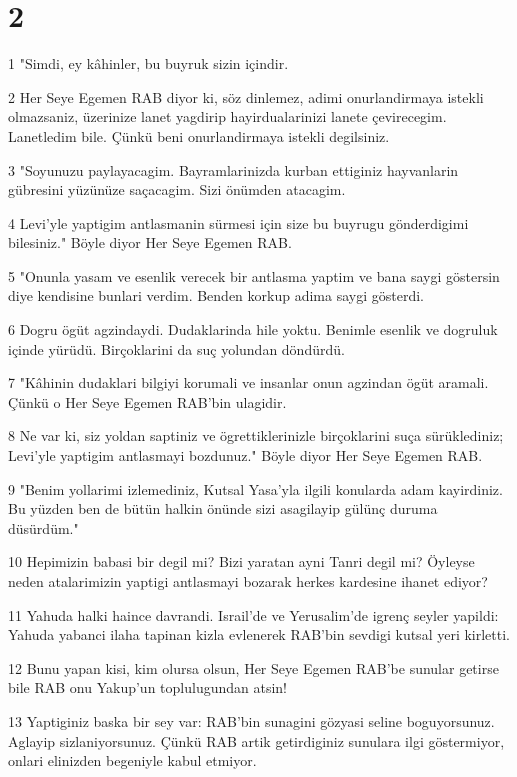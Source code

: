\chapter{2}

\par 1 "Simdi, ey kâhinler, bu buyruk sizin içindir.
\par 2 Her Seye Egemen RAB diyor ki, söz dinlemez, adimi onurlandirmaya istekli olmazsaniz, üzerinize lanet yagdirip hayirdualarinizi lanete çevirecegim. Lanetledim bile. Çünkü beni onurlandirmaya istekli degilsiniz.
\par 3 "Soyunuzu paylayacagim. Bayramlarinizda kurban ettiginiz hayvanlarin gübresini yüzünüze saçacagim. Sizi önümden atacagim.
\par 4 Levi'yle yaptigim antlasmanin sürmesi için size bu buyrugu gönderdigimi bilesiniz." Böyle diyor Her Seye Egemen RAB.
\par 5 "Onunla yasam ve esenlik verecek bir antlasma yaptim ve bana saygi göstersin diye kendisine bunlari verdim. Benden korkup adima saygi gösterdi.
\par 6 Dogru ögüt agzindaydi. Dudaklarinda hile yoktu. Benimle esenlik ve dogruluk içinde yürüdü. Birçoklarini da suç yolundan döndürdü.
\par 7 "Kâhinin dudaklari bilgiyi korumali ve insanlar onun agzindan ögüt aramali. Çünkü o Her Seye Egemen RAB'bin ulagidir.
\par 8 Ne var ki, siz yoldan saptiniz ve ögrettiklerinizle birçoklarini suça sürüklediniz; Levi'yle yaptigim antlasmayi bozdunuz." Böyle diyor Her Seye Egemen RAB.
\par 9 "Benim yollarimi izlemediniz, Kutsal Yasa'yla ilgili konularda adam kayirdiniz. Bu yüzden ben de bütün halkin önünde sizi asagilayip gülünç duruma düsürdüm."
\par 10 Hepimizin babasi bir degil mi? Bizi yaratan ayni Tanri degil mi? Öyleyse neden atalarimizin yaptigi antlasmayi bozarak herkes kardesine ihanet ediyor?
\par 11 Yahuda halki haince davrandi. Israil'de ve Yerusalim'de igrenç seyler yapildi: Yahuda yabanci ilaha tapinan kizla evlenerek RAB'bin sevdigi kutsal yeri kirletti.
\par 12 Bunu yapan kisi, kim olursa olsun, Her Seye Egemen RAB'be sunular getirse bile RAB onu Yakup'un toplulugundan atsin!
\par 13 Yaptiginiz baska bir sey var: RAB'bin sunagini gözyasi seline boguyorsunuz. Aglayip sizlaniyorsunuz. Çünkü RAB artik getirdiginiz sunulara ilgi göstermiyor, onlari elinizden begeniyle kabul etmiyor.
